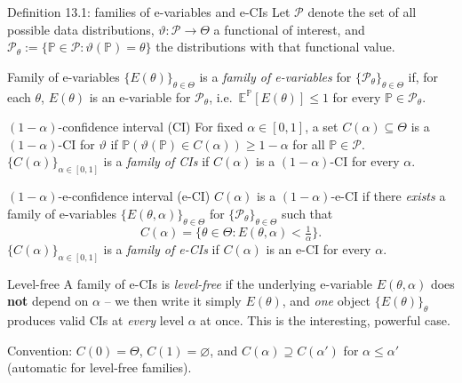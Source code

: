 \documentclass[aspectratio=169,10pt]{beamer}
\newcommand{\E}{\mathbb{E}}
\newcommand{\Pb}{\mathbb{P}}
\newcommand{\calP}{\mathcal{P}}
\newcommand{\Theset}{\Theta}
\begin{document}
\begin{frame}[allowframebreaks]{Definition 13.1: families of e-variables and e-CIs}
  Let $\calP$ denote the set of all possible data distributions, $\vartheta:\calP\to\Theset$ a functional of interest, and $\calP_\theta := \{\Pb\in\calP : \vartheta(\Pb)=\theta\}$ the distributions with that functional value.

  \begin{block}{Family of e-variables}
    $\{E(\theta)\}_{\theta\in\Theset}$ is a \emph{family of e-variables} for $\{\calP_\theta\}_{\theta\in\Theset}$ if, for each $\theta$, $E(\theta)$ is an e-variable for $\calP_\theta$, i.e.\ $\E^{\Pb}[E(\theta)] \leq 1$ for every $\Pb \in \calP_\theta$.
  \end{block}

  \begin{block}{$(1-\alpha)$-confidence interval (CI)}
    For fixed $\alpha \in [0,1]$, a set $C(\alpha)\subseteq\Theset$ is a $(1-\alpha)$-CI for $\vartheta$ if $\Pb(\vartheta(\Pb)\in C(\alpha)) \geq 1-\alpha$ for all $\Pb \in \calP$. $\{C(\alpha)\}_{\alpha\in[0,1]}$ is a \emph{family of CIs} if $C(\alpha)$ is a $(1-\alpha)$-CI for every $\alpha$.
  \end{block}

  \framebreak

  \begin{block}{$(1-\alpha)$-e-confidence interval (e-CI)}
    $C(\alpha)$ is a $(1-\alpha)$-e-CI if there \emph{exists} a family of e-variables $\{E(\theta,\alpha)\}_{\theta\in\Theset}$ for $\{\calP_\theta\}_{\theta\in\Theset}$ such that
    \[
      C(\alpha) = \Big\{ \theta \in \Theset : E(\theta,\alpha) < \tfrac{1}{\alpha} \Big\}.
    \]
    $\{C(\alpha)\}_{\alpha\in[0,1]}$ is a \emph{family of e-CIs} if $C(\alpha)$ is an e-CI for every $\alpha$.
  \end{block}

  \begin{block}{Level-free}
    A family of e-CIs is \emph{level-free} if the underlying e-variable $E(\theta,\alpha)$ does \textbf{not} depend on $\alpha$ -- we then write it simply $E(\theta)$, and \emph{one} object $\{E(\theta)\}_{\theta}$ produces valid CIs at \emph{every} level $\alpha$ at once. This is the interesting, powerful case.
  \end{block}

  Convention: $C(0)=\Theset$, $C(1)=\varnothing$, and $C(\alpha)\supseteq C(\alpha')$ for $\alpha\le\alpha'$ (automatic for level-free families).
\end{frame}
\end{document}
